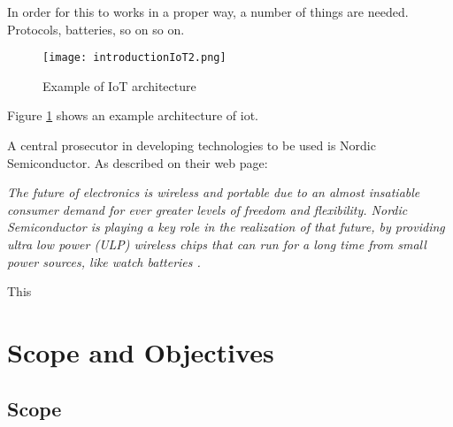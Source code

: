 In order for this to works in a proper way, a number of things are needed. Protocols, batteries, so on so on. 


\begin{figure}[ht]
    \centering
    \texttt{[image: introductionIoT2.png]}    
    \caption{Example of IoT architecture}
    \label{iotExampleArchitecture}
\end{figure}

Figure \ref{iotExampleArchitecture} shows an example architecture of \gls{iot}. 




A central prosecutor in developing technologies to be used is Nordic Semiconductor. As described on their web page: 

\begin{displayquote}
\textit{The future of electronics is wireless and portable due to an almost insatiable consumer demand for ever greater levels of freedom and flexibility. Nordic Semiconductor is playing a key role in the realization of that future, by providing ultra low power (ULP) wireless chips that can run for a long time from small power sources, like watch batteries \cite{aboutNordic}.}
\end{displayquote}

This 





\section{Scope and Objectives}

\subsection{Scope}

